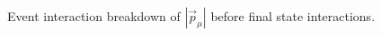 \documentclass{article}
\newcommand{\vm}{\vec{p}_\mu}
\begin{document}
\begin{figure}
    \caption{Event interaction breakdown of $|\vm|$ before final state interactions.}
    \label{fig:pre-fsi-inte-breakdown}
\end{figure}
\end{document}
